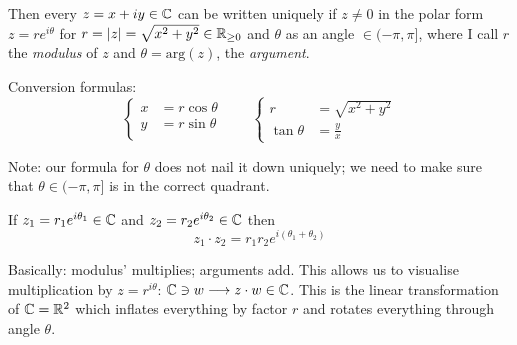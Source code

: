 \documentclass[10pt]{scrartcl}
\begin{document}
\begin{center}
\end{center}


Then every $z = x + iy \in\mathbb{C}$ can be written uniquely if $z \neq 0$ in the polar form $z = re^{i\theta}$ for $r = |z| = \sqrt{x^2 + y^2} \in\mathbb{R}_{\geq 0}$ and $\theta$ as an angle $\in (-\pi,\pi]$, where I call $r$ the \emph{modulus} of $z$ and $\theta = \mathrm{arg}(z)$, the \emph{argument}. 

Conversion formulas: 
\[\begin{cases}
x &= r\cos\theta\\
y &= r \sin\theta\\
\end{cases}
\qquad 
\begin{cases}
r &= \sqrt{x^2 + y^2}\\
\tan \theta &= \frac{y}{x}
\end{cases}
\]

Note: our formula for $\theta$ does not nail it down uniquely; we need to make sure that $\theta \in (-\pi,\pi]$ is in the correct quadrant.\\

\begin{theorem}
If $z_1 = r_1e^{i\theta_1} \in\mathbb{C}$ and $z_2 = r_2 e^{i\theta_2}\in\mathbb{C}$ then 
\[z_1 \cdot z_2 = r_1 r_2 e^{i(\theta_1 + \theta_2)}\]
\end{theorem}

Basically: modulus' multiplies; arguments add. This allows us to visualise multiplication by $z = r^{i\theta}$: $\mathbb{C} \ni w \longrightarrow z\cdot w \in\mathbb{C}$. This is the linear transformation of $\mathbb{C} = \mathbb{R}^2$ which inflates everything by factor $r$ and rotates everything through angle $\theta$.\\
\end{document}
